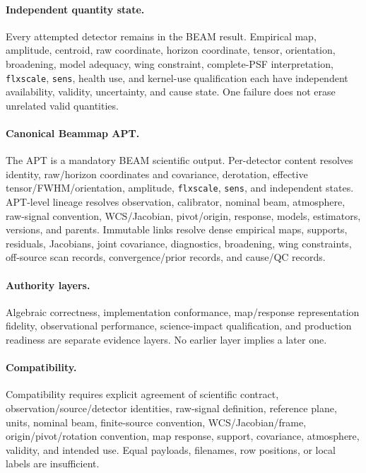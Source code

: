 \paragraph{Independent quantity state.} Every attempted detector remains in
the BEAM result. Empirical map, amplitude, centroid, raw coordinate,
horizon coordinate, tensor, orientation, broadening, model adequacy, wing
constraint, complete-PSF interpretation, \texttt{flxscale}, \texttt{sens},
health use, and kernel-use qualification each have independent availability,
validity, uncertainty, and cause state. One failure does not erase unrelated
valid quantities.

\paragraph{Canonical Beammap APT.} The APT is a mandatory BEAM scientific
output. Per-detector content resolves identity, raw/horizon coordinates and
covariance, derotation, effective tensor/FWHM/orientation, amplitude,
\texttt{flxscale}, \texttt{sens}, and independent states. APT-level lineage
resolves observation, calibrator, nominal beam, atmosphere, raw-signal
convention, WCS/Jacobian, pivot/origin, response, models, estimators, versions,
and parents. Immutable links resolve dense empirical maps, supports, residuals,
Jacobians, joint covariance, diagnostics, broadening, wing constraints,
off-source scan records, convergence/prior records, and cause/QC records.

\paragraph{Authority layers.} Algebraic correctness, implementation
conformance, map/response representation fidelity, observational performance,
science-impact qualification, and production readiness are separate evidence
layers. No earlier layer implies a later one.

\paragraph{Compatibility.} Compatibility requires explicit agreement of
scientific contract, observation/source/detector identities, raw-signal
definition, reference plane, units, nominal beam, finite-source convention,
WCS/Jacobian/frame, origin/pivot/rotation convention, map response, support,
covariance, atmosphere, validity, and intended use. Equal payloads, filenames,
row positions, or local labels are insufficient.
